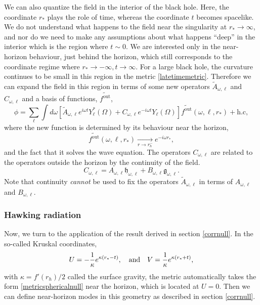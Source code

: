 \documentclass[12pt]{article}
\def\fout{f^{\text{out}}}
\def\grey{\mathfrak{g}}
\def\white{\mathfrak{h}}
\def\rtor{{r_*}}
\newcommand{\be}{\begin{equation}}
\newcommand{\ee}{\end{equation}}
\begin{document}
We can also quantize the field in the interior of the black hole. Here, the coordinate $\rtor$ plays the role of time, whereas the coordinate $t$ becomes spacelike. We do not understand what happens to the field near the singularity at $\rtor \rightarrow \infty$, and nor do we need to make any assumptions about what happens ``deep'' in the interior which is the region where $t \sim 0$.  We are interested only in the near-horizon behaviour, just behind the horizon, which still corresponds to the coordinate regime where $\rtor \rightarrow -\infty, t \rightarrow \infty$.  For a large black hole, the curvature continues to be small in this region in the  metric \eqref{latetimemetric}. Therefore we can
expand the field in this region in terms of some new operators $\widetilde{A}_{\omega, \ell}$ and $C_{\omega, \ell}$ and a basis of functions, $\widetilde{\fout}$,
\be
\label{fieldinside}
\phi = \sum_{\ell} \int d \omega \left[\widetilde{A}_{\omega, \ell} e^{i \omega t} Y_{\ell}^*(\Omega) + C_{\omega, \ell} e^{-i \omega t} Y_{\ell}(\Omega)  \right]  \widetilde{\fout}(\omega, \ell,\rtor)   + \text{h.c},
\ee
where the new function is determined by its behaviour near the horizon,
\be
\label{ftexpansion}
\widetilde{\fout}(\omega, \ell, \rtor) \underset{r \rightarrow r_h^-}{\longrightarrow} e^{-i \omega \rtor},
\ee
and the fact that it solves the wave equation. The operators $C_{\omega, \ell}$ are related to the operators outside the horizon by the continuity of the field.\be
C_{\omega, \ell} = A_{\omega, \ell} \white_{\omega, \ell} + B_{\omega, \ell} \grey_{\omega, \ell}.
\ee
Note that continuity {\em cannot} be used to fix the operators $\widetilde{A}_{\omega, \ell}$ in terms of $A_{\omega, \ell}$ and $B_{\omega, \ell}$.


\subsubsection*{Hawking radiation }
Now, we turn to the application of the result derived in section \ref{corrnull}. In the  so-called Kruskal coordinates,
\be
\label{kruskaldef}
U = -{1 \over \kappa} e^{\kappa (\rtor - t)}, \quad \text{and} \quad V = {1 \over \kappa} e^{\kappa(\rtor + t)},
\ee
with $\kappa = f'(r_h)/2$ called the surface gravity, the metric
automatically takes the form \eqref{metricsphericalnull} near the horizon, which is located at $U = 0$. Then we can define near-horizon modes in this geometry as described in section \ref{corrnull}.
\end{document}
